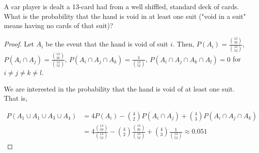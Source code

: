 \begin{exercise}{50}
A car player is dealt a 13-card had from a well shiffled, standard deck of cards. What is the probability that the hand is void in at least one suit ("void in a suit" means having no cards of that suit)?
\end{exercise}

\begin{proof}
    Let $A_i$ be the event that the hand is void of suit $i$. Then, $P(A_i) = \frac{{13 \choose 39}}{{13 \choose 52}}$, $P(A_i \cap A_j) = \frac{{13 \choose 26}}{{13 \choose 52}}$, $P(A_i \cap A_j \cap A_k) = \frac{1}{{13 \choose 52}}$, $P(A_i \cap A_j \cap A_k \cap A_l) = 0$ for $i \neq j \neq k \neq l$.

    We are interested in the probability that the hand is void of at least one suit. That is,

    \begin{align*}
        P(A_1 \cup A_1 \cup A_3 \cup A_4) &= 4 P(A_i) - {4 \choose 2} P(A_i \cap A_j) + {4 \choose 3} P(A_i \cap A_j \cap A_k) \\
        &= 4 \frac{{13 \choose 39}}{{13 \choose 52}} - {4 \choose 2} \frac{{13 \choose 26}}{{13 \choose 52}} + {4 \choose 3} \frac{1}{{13 \choose 52}} \approx 0.051
    \end{align*}

\end{proof}

